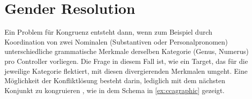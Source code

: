 \section{Gender Resolution}
\label{sec:gendres}

Ein Problem für Kongruenz entsteht dann, wenn zum Beispiel durch Koordination
von zwei Nominalen (Substantiven oder Personalpronomen) unterschiedliche
grammatische Merkmale derselben Kategorie (Genus, Numerus) pro Controller
vorliegen. Die Frage in diesem Fall ist, wie ein Target, das für die jeweilige
Kategorie flektiert, mit diesen divergierenden Merkmalen umgeht. Eine
Möglichkeit der Konfliktlösung besteht darin, lediglich mit dem nächsten
Konjunkt zu kongruieren \autocites[;
vgl.][179--180]{corbett1983}[168--170]{corbett2006}, wie in dem Schema in
\cref{ex:ccagraphic} gezeigt.

